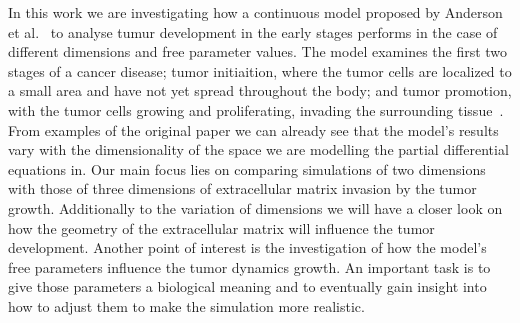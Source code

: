 In this work we are investigating how a continuous model proposed by Anderson et al.~\cite{anderson_continuous_1998,anderson_mathematical_2000} to analyse tumur development in the early stages performs in the case of different dimensions and free parameter values. The model examines the first two stages of a cancer disease; tumor initiaition, where the tumor cells are localized to a small area and have not yet spread throughout the body; and tumor promotion, with the tumor cells growing and proliferating, invading the surrounding tissue~\cite{10.1158/2159-8290.CD-21-1059}. From examples of the original paper we can already see that the model's results vary with the dimensionality of the space we are modelling the partial differential equations in. Our main focus lies on comparing simulations of two dimensions with those of three dimensions of extracellular matrix invasion by the tumor growth. Additionally to the variation of dimensions we will have a closer look on how the geometry of the extracellular matrix will influence the tumor development. \newline 
Another point of interest is the investigation of how the model's free parameters influence the tumor dynamics growth. An important task is to give those parameters a biological meaning and to eventually gain insight into how to adjust them to make the simulation more realistic.